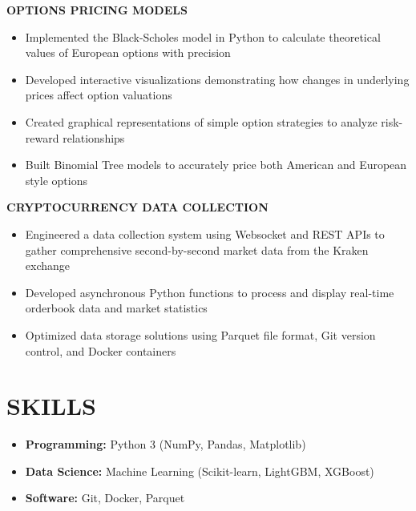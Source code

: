 \documentclass[10pt,letterpaper]{article}
\begin{document}
\begin{flushleft}
  \textbf{\color{subheadingcolor}OPTIONS PRICING MODELS}
  \begin{itemize}[leftmargin=*,nosep,itemsep=2pt]
      \item Implemented the Black-Scholes model in Python to calculate theoretical values of European options with precision
      \item Developed interactive visualizations demonstrating how changes in underlying prices affect option valuations
      \item Created graphical representations of simple option strategies to analyze risk-reward relationships
      \item Built Binomial Tree models to accurately price both American and European style options
  \end{itemize}
  \end{flushleft}


\begin{flushleft}
\textbf{\color{subheadingcolor}CRYPTOCURRENCY DATA COLLECTION}
\begin{itemize}[leftmargin=*,nosep,itemsep=2pt]
    \item Engineered a data collection system using Websocket and REST APIs to gather comprehensive second-by-second market data from the Kraken exchange
    \item Developed asynchronous Python functions to process and display real-time orderbook data and market statistics
    \item Optimized data storage solutions using Parquet file format, Git version control, and Docker containers
\end{itemize}
\end{flushleft}

\vspace{0.5em}
\section{SKILLS}
\vspace{0.5em}
\begin{itemize}[leftmargin=*,nosep,itemsep=2pt]
  \item \textbf{Programming:} Python 3 (NumPy, Pandas, Matplotlib)
  \item \textbf{Data Science:} Machine Learning (Scikit-learn, LightGBM, XGBoost)
  \item \textbf{Software:} Git, Docker, Parquet  
\end{itemize}
\end{document}
